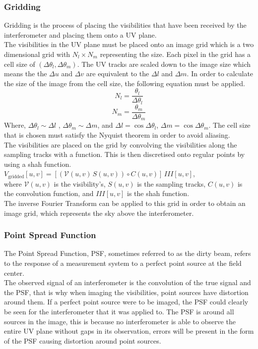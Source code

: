 \subsubsection{Gridding}
Gridding is the process of placing the visibilities that have been received by the interferometer and placing them onto a UV plane.\\
The visibilities in the UV plane must be placed onto an image grid which is a two dimensional grid with $N_l \times N_m$ representing the size. Each pixel in the grid has a cell size of $(\Delta \theta_l, \Delta \theta_m)$. The UV tracks are scaled down to the image size which means the the $\Delta u$ and $\Delta v$ are equivalent to the $\Delta l$  and $\Delta m$. In order to calculate the size of the image from the cell size, the following equation must be applied. 
$$N_l = \frac{\theta_l}{\Delta \theta_l}$$
$$N_m = \frac{\theta_m}{\Delta \theta_m}$$
Where,  $\Delta \theta_l\sim \Delta l$ , $\Delta \theta_m \sim \Delta m$, and $\Delta l = \cos{\Delta \theta_l}$, $\Delta m = \cos{\Delta \theta_m}$. The cell size that is chosen must satisfy the Nyquist theorem in order to avoid aliasing.\\
The visibilities are placed on the grid by convolving the visibilities along the sampling tracks with a function. This is then discretised onto regular points by using a shah function.\\
$V_\text{gridded}[u,v]=[(\mathcal{V}(u,v) \, S(u,v))
\circ C(u,v)] \, III[u,v]$,\\
where $\mathcal{V}(u,v)$ is the visibility's, $ S(u,v)$ is
the sampling tracks, $C(u,v)$ is the convolution function, and $III[u,v]$ is the shah function.\\
The inverse Fourier Transform can be applied to this grid in order to obtain an image grid, which represents the sky above the interferometer.

\subsubsection{Point Spread Function}
The Point Spread Function, PSF, sometimes referred to as the dirty beam, refers to the response of a
measurement system to a perfect point source at the field center\cite{TEXTBOOK}.
\\
The observed signal of an interferometer is
the convolution of the true signal and the PSF, that is why when imaging the visibilities, point sources
have distortion around them. If a perfect point source were to be imaged, the PSF could clearly be seen for the interferometer that it was applied to. 
The PSF is around all sources in the image, this is because no interferometer is able to observe the entire UV plane without gaps in its observation, errors will be present in the form of the PSF causing distortion around point sources.
